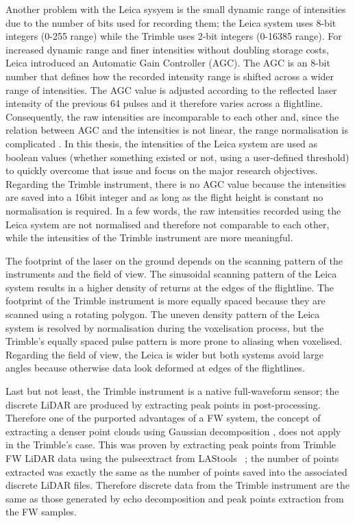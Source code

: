 \documentclass{subfiles}
\begin{document}
	\par Another problem with the Leica sysyem is the small dynamic range of intensities due to the number of bits used for recording them; the Leica system uses 8-bit integers (0-255 range) while the Trimble uses 2-bit integers (0-16385 range). For increased dynamic range and finer intensities without doubling storage costs, Leica introduced an Automatic Gain Controller (AGC). The AGC is an 8-bit number that defines how the recorded intensity range is shifted across a wider range of intensities. The AGC value is adjusted according to the reflected laser intensity of the previous 64 pulses and it therefore varies across a flightline. Consequently, the raw intensities are incomparable to each other and, since the relation between AGC and the intensities is not linear, the range normalisation is complicated \cite{Lehner2011}\cite{Korpela2010}. In this thesis, the intensities of the Leica system are used as boolean values (whether something existed or not, using a user-defined threshold) to quickly overcome that issue and focus on the major research objectives. Regarding the Trimble instrument, there is no AGC value because the intensities are saved into a 16bit integer and as long as the flight height is constant no normalisation is required. In a few words, the raw intensities recorded using the Leica system are not normalised and therefore not comparable to each other, while the intensities of the Trimble instrument are more meaningful. 
	
	\par The footprint of the laser on the ground depends on the scanning pattern of the instruments and the field of view. The sinusoidal scanning pattern of the Leica system results in a higher density of returns at the edges of the flightline. The footprint of the Trimble instrument is more equally spaced because they are scanned using a rotating polygon. The uneven density pattern of the Leica system is resolved by normalisation during the voxelisation process, but the Trimble's equally spaced pulse pattern is more prone to aliasing when voxelised. Regarding the field of view, the Leica is wider but both systems avoid large angles because otherwise data look deformed at edges of the flightlines. 
	
	\par Last but not least, the Trimble instrument is a native full-waveform sensor; the discrete LiDAR are produced by extracting peak points in post-processing. Therefore one of the purported advantages of a FW system, the concept of extracting a denser point clouds using Gaussian decomposition \cite{Wanger2004}, does not apply in the Trimble's case.  This was proven by extracting peak points from Trimble FW LiDAR data using the pulseextract from LAStools ~\cite{LAStools}; the number of points extracted was exactly the same as the number of points saved into the associated discrete LiDAR files. Therefore discrete data from the Trimble instrument are the same as those generated by echo decomposition and peak points extraction from the FW samples. 
	
\end{document}
